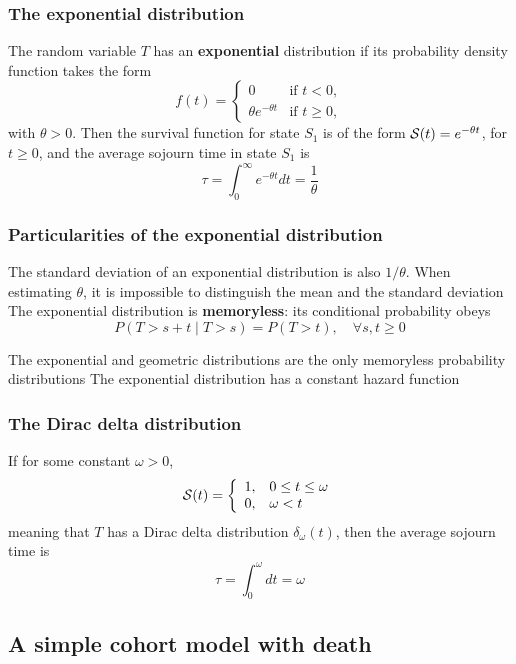 \documentclass[aspectratio=169]{beamer}\usepackage[]{graphicx}\usepackage[]{xcolor}
\begin{document}
\begin{frame}\frametitle{The exponential distribution}
The random variable $T$ has an \textbf{exponential} distribution if its
probability density function takes the form
\begin{equation}\label{eq:exp_distrib}
f(t)=\begin{cases}0&\textrm{if }t<0,\\
\theta e^{-\theta t}&\textrm{if }t\geq 0,
\end{cases}
\end{equation}
with $\theta>0$. Then the
survival function for state $S_1$ is of the form $\S(t)=e^{-\theta
  t}$, for $t\geq 0$, and the average sojourn time in state $S_1$ is
\[
\tau=\int_0^\infty e^{-\theta t}dt=\frac 1\theta
\]
\end{frame}

\begin{frame}\frametitle{Particularities of the exponential distribution}
The standard deviation of an exponential distribution is also $1/\theta$. When estimating $\theta$, it is impossible to distinguish the mean and the standard deviation
\vfill
The exponential distribution is \textbf{memoryless}: its conditional probability obeys
\[
P(T > s + t\; |\; T > s) = P(T > t),\quad\forall s, t \ge 0
\]

The exponential and geometric distributions are the only memoryless probability distributions
\vfill
The exponential distribution has a constant hazard function
\end{frame}

\begin{frame}\frametitle{The Dirac delta distribution}
If for some constant $\omega>0$,
\[
\S(t)=
\left\{
\begin{array}{ll}
1, & 0\leq t\leq\omega \\
0, & \omega<t
\end{array}
\right.
\]
meaning that $T$ has a Dirac delta distribution
$\delta_\omega(t)$, then the average sojourn time is
\[
\tau=\int_0^\omega dt=\omega
\]
\end{frame}


\subsection{A simple cohort model with death} 
\end{document}
